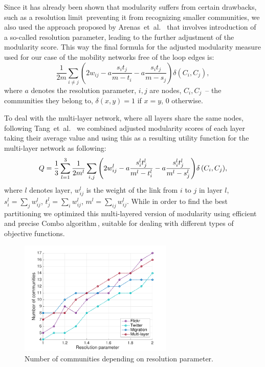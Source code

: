 \documentclass[aps,superscriptaddress,showkeys,nofootinbib]{revtex4-1}
\begin{document}
Since it has already been shown that modularity suffers from certain drawbacks, such as a resolution limit\,\cite{Fortunato02012007ResolutionLimit,Good2010PerformanceOfModularity} preventing it from recognizing smaller communities, we also used the approach proposed by Arenas~et~al.~\cite{Arenas2008Analysis} that involves introduction of a so-called resolution parameter, leading to the further adjustment of the modularity score. This way the final formula for the adjusted modularity measure used for our case of the mobility networks free of the loop edges is:
\[
	\frac{1}{2m}
	\sum\limits_{i\neq j}
		\left(
			2w_{ij} - a \frac{s_i t_j}{m - t_i} - a \frac{s_i t_j}{m - s_j}
		\right)
	\delta(C_i,C_j),
\]
where $a$ denotes the resolution parameter, $i,j$ are nodes, $C_i, C_j$~-- the communities they belong to, $\delta(x,y)=1$ if $x=y$, $0$ otherwise.

To deal with the multi-layer network, where all layers share the same nodes, following Tang~et~al.~\cite{tang2012community} we combined adjusted modularity scores of each layer taking their average value and using this as a resulting utility function for the multi-layer network as following:
\[
	Q = {1 \over 3}
		\sum_{l=1}^3{
			{1 \over 2m^l}
			\sum_{i,j}{
				\left( 2w^l_{ij} - a \frac{ s^l_i t^l_j }{ m^l - t^l_i } - a \frac{ s^l_i t^l_j }{ m^l - s^l_j } \right)
			}
			\delta\left( C_i, C_j\right)
		},
\]
where $l$ denotes layer, $w^l_{ij}$ is the weight of the link from $i$ to $j$ in layer $l$, $s^l_i=\sum_j w^l_{ij}$, $t^l_j=\sum_i w^l_{ij}$, $m^l = \sum_{ij} w^l_{ij}$. While in order to find the best partitioning we optimized this multi-layered version of modularity using efficient and precise Combo algorithm\,\cite{Combo}, suitable for dealing with different types of objective functions.

\begin{figure}[b]
\centering
\includegraphics[width=0.65\textwidth]{number_of_communities-eps-converted-to.pdf}
\caption{\label{fig::comm_number}Number of communities depending on resolution parameter.}
\end{figure}
\end{document}
